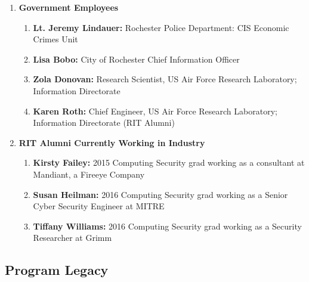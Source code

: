 \documentclass[12pt]{article}
\begin{document}
\begin{enumerate}[noitemsep]
    \item \textbf{Government Employees}
    \begin{enumerate}[noitemsep]
        \item \textbf{Lt. Jeremy Lindauer:} Rochester Police Department:  CIS Economic Crimes Unit
        \item \textbf{Lisa Bobo:} City of Rochester Chief Information Officer
        \item \textbf{Zola Donovan:}  Research Scientist, US Air Force Research Laboratory; Information Directorate 
        \item \textbf{Karen Roth:}  Chief Engineer, US Air Force Research Laboratory; Information Directorate  (RIT Alumni)

    \end{enumerate}
    \item \textbf{RIT Alumni Currently Working in Industry}
        \begin{enumerate}[noitemsep]
        \item \textbf{Kirsty Failey:} 2015 Computing Security grad working as a consultant at Mandiant, a Fireeye Company
        \item \textbf{Susan Heilman:} 2016 Computing Security grad working as a Senior Cyber Security Engineer at MITRE
        \item \textbf{Tiffany Williams:} 2016 Computing Security grad working as a Security Researcher at Grimm
    \end{enumerate}

\end{enumerate}



\subsection{Program Legacy}
\end{document}
